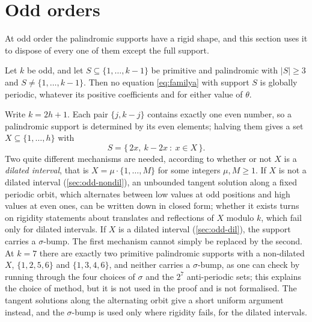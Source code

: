 \section{Odd orders}
\label{sec:oddk}

At odd order the palindromic supports have a rigid shape, and this section
uses it to dispose of every one of them except the full support.

\begin{theorem}
\label{thm:oddk}
Let $k$ be odd, and let $S\subseteq\{1,\dots,k-1\}$ be primitive and
palindromic with $|S|\ge3$ and $S\ne\{1,\dots,k-1\}$. Then no equation
\eqref{eq:familya} with support $S$ is globally periodic, whatever its
positive coefficients and for either value of $\theta$.
\end{theorem}

Write $k=2h+1$. Each pair $\{j,k-j\}$ contains
exactly one even number, so a palindromic support is determined by its even
elements; halving them gives a set $X\subseteq\{1,\dots,h\}$ with
\begin{equation}
S=\{\,2x,\ k-2x\ :\ x\in X\,\}.
\label{eq:odd-coords}
\end{equation}
Two quite different mechanisms are needed, according to whether or not $X$
is a \emph{dilated interval}, that is $X=\mu\cdot\{1,\dots,M\}$ for some
integers $\mu,M\ge1$.
If $X$ is not a dilated interval (\autoref{sec:odd-nondil}), an unbounded
tangent solution along a fixed periodic orbit, which alternates between low
values at odd positions and high values at even ones, can be written down in
closed form; whether it exists turns on rigidity statements about
translates and reflections of $X$ modulo $k$, which fail only for dilated
intervals. If $X$ is a dilated interval (\autoref{sec:odd-dil}), the support
carries a $\sigma$-bump. The first mechanism cannot simply be replaced by
the second. At $k=7$ there are
exactly two primitive palindromic supports with a non-dilated $X$,
$\{1,2,5,6\}$ and $\{1,3,4,6\}$, and neither carries a
$\sigma$-bump, as one can check by running through the four choices of
$\sigma$ and the $2^7$ anti-periodic sets; this explains the choice of
method, but it is not used in the proof and is not formalised. The tangent
solutions along the alternating orbit give a short uniform argument instead, and the
$\sigma$-bump is used only where rigidity fails, for the dilated intervals.

